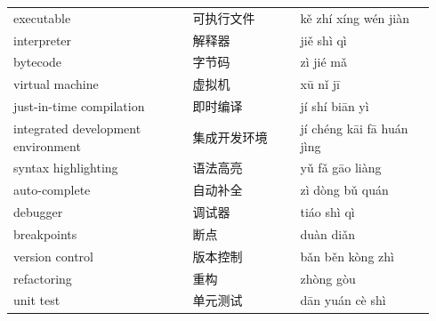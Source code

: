 \documentclass[11pt]{article}
\begin{document}
\begin{longtable}{@{}p{0.40\linewidth}p{0.24\linewidth}p{0.30\linewidth}@{}}
executable & 可执行文件 & kě zhí xíng wén jiàn \\
interpreter & 解释器 & jiě shì qì \\
bytecode & 字节码 & zì jié mǎ \\
virtual machine & 虚拟机 & xū nǐ jī \\
just-in-time compilation & 即时编译 & jí shí biān yì \\
integrated development environment & 集成开发环境 & jí chéng kāi fā huán jìng \\
syntax highlighting & 语法高亮 & yǔ fǎ gāo liàng \\
auto-complete & 自动补全 & zì dòng bǔ quán \\
debugger & 调试器 & tiáo shì qì \\
breakpoints & 断点 & duàn diǎn \\
version control & 版本控制 & bǎn běn kòng zhì \\
refactoring & 重构 & zhòng gòu \\
unit test & 单元测试 & dān yuán cè shì \\
\end{longtable}
\end{document}
